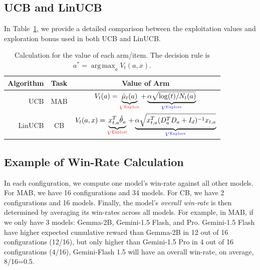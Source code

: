 \documentclass[11pt, logo]{googledeepmind}
\DeclareMathOperator*{\argmax}{arg\,max}
\newcommand{\mred}[1]{\textcolor{red}{#1}}
\newcommand{\mblue}[1]{\textcolor{blue}{#1}}
\theoremstyle{plain}
\theoremstyle{definition}
\begin{document}
\subsection{UCB and LinUCB}
In Table~\ref{tab:mab_cb_eq}, we provide a detailed comparison between the exploitation values and exploration bonus used in both UCB and LinUCB.
\begin{table}[h]
\centering
\begin{tabular}{@{}r|c|c@{}}
\toprule
Algorithm & Task & Value of Arm \\ \midrule
UCB       & MAB  &     $V_t(a) = \underbrace{\hat\mu_t(a) \vphantom{\alpha\log(t)/N_t(a)}}_{\mred{V^\text{Exploit}}} + \underbrace{\alpha\sqrt{\log(t)/N_t(a)}}_{\mblue{V^\text{Explore}}}$         \\ \midrule
LinUCB    & CB   &       $V_t(a, x) = \underbrace{x_{t,a}^T\hat\theta_a}_{\mred{V^\text{Exploit}}} + \underbrace{\alpha\sqrt{x^T_{t,a}(D^T_aD_a+I_d)^{-1}x_{t,a}}}_{\mblue{V^\text{Explore}}}$ \\ \bottomrule
\end{tabular}
\caption{Calculation for the value of each arm/item. The decision rule is $a^* = \argmax_a V_t (a, x)$.}
\label{tab:mab_cb_eq}
\end{table}
\subsection{Example of Win-Rate Calculation}
\label{sec:app:win-rate-example}
In each configuration, we compute one model's win-rate against all other models. For MAB, we have 16 configurations and 34 models. For CB, we have 2 configurations and 16 models. Finally, the model's \emph{overall win-rate} is then determined by averaging its win-rates across all models. For example, in MAB, if we only have 3 models: Gemma-2B, Gemini-1.5 Flash, and Pro. Gemini-1.5 Flash have higher expected cumulative reward than Gemma-2B in 12 out of 16 configurations (12/16), but only higher than Gemini-1.5 Pro in 4 out of 16 configurations (4/16), Gemini-Flash 1.5 will have an overall win-rate, on average, 8/16=0.5.
\end{document}
